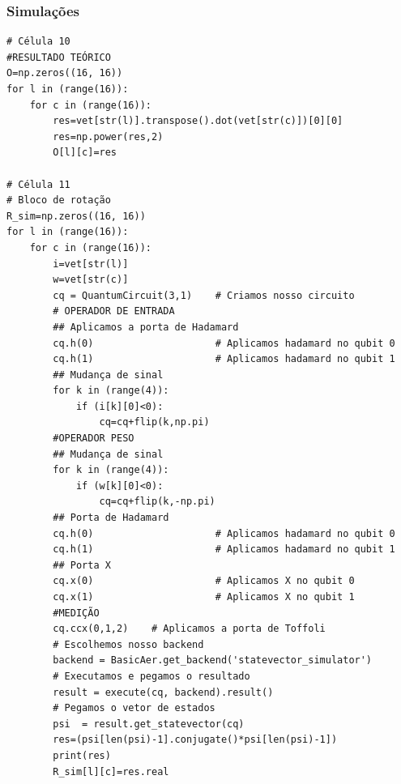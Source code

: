 \subsubsection{Simulações}

\begin{verbatim}
# Célula 10
#RESULTADO TEÓRICO
O=np.zeros((16, 16))
for l in (range(16)):
    for c in (range(16)):
        res=vet[str(l)].transpose().dot(vet[str(c)])[0][0]
        res=np.power(res,2)
        O[l][c]=res

# Célula 11
# Bloco de rotação
R_sim=np.zeros((16, 16))
for l in (range(16)):
    for c in (range(16)):
        i=vet[str(l)]
        w=vet[str(c)]
        cq = QuantumCircuit(3,1)    # Criamos nosso circuito        
        # OPERADOR DE ENTRADA
        ## Aplicamos a porta de Hadamard
        cq.h(0)                     # Aplicamos hadamard no qubit 0
        cq.h(1)                     # Aplicamos hadamard no qubit 1        
        ## Mudança de sinal
        for k in (range(4)):
            if (i[k][0]<0):
                cq=cq+flip(k,np.pi)
        #OPERADOR PESO
        ## Mudança de sinal
        for k in (range(4)):
            if (w[k][0]<0):
                cq=cq+flip(k,-np.pi)
        ## Porta de Hadamard
        cq.h(0)                     # Aplicamos hadamard no qubit 0
        cq.h(1)                     # Aplicamos hadamard no qubit 1
        ## Porta X
        cq.x(0)                     # Aplicamos X no qubit 0
        cq.x(1)                     # Aplicamos X no qubit 1
        #MEDIÇÃO
        cq.ccx(0,1,2)    # Aplicamos a porta de Toffoli
        # Escolhemos nosso backend
        backend = BasicAer.get_backend('statevector_simulator')  
        # Executamos e pegamos o resultado
        result = execute(cq, backend).result()           
        # Pegamos o vetor de estados
        psi  = result.get_statevector(cq)                        
        res=(psi[len(psi)-1].conjugate()*psi[len(psi)-1])
        print(res)
        R_sim[l][c]=res.real


\end{verbatim}
